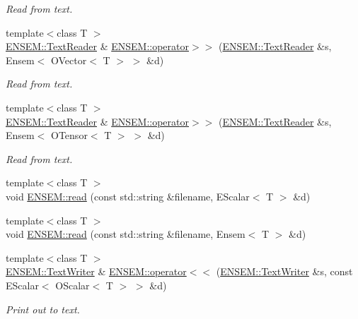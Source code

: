 \begin{DoxyCompactItemize}
\begin{DoxyCompactList}\small\item\em Read from text. \end{DoxyCompactList}\item 
{\footnotesize template$<$class T $>$ }\\\mbox{\hyperlink{classENSEM_1_1TextReader}{E\+N\+S\+E\+M\+::\+Text\+Reader}} \& \mbox{\hyperlink{namespaceENSEM_a0c98998b29525fa9334da078ac37fe70}{E\+N\+S\+E\+M\+::operator$>$$>$}} (\mbox{\hyperlink{classENSEM_1_1TextReader}{E\+N\+S\+E\+M\+::\+Text\+Reader}} \&s, Ensem$<$ O\+Vector$<$ T $>$ $>$ \&d)
\begin{DoxyCompactList}\small\item\em Read from text. \end{DoxyCompactList}\item 
{\footnotesize template$<$class T $>$ }\\\mbox{\hyperlink{classENSEM_1_1TextReader}{E\+N\+S\+E\+M\+::\+Text\+Reader}} \& \mbox{\hyperlink{namespaceENSEM_a0fb9e35cf8c1d41d42dd10cefcf7cbe5}{E\+N\+S\+E\+M\+::operator$>$$>$}} (\mbox{\hyperlink{classENSEM_1_1TextReader}{E\+N\+S\+E\+M\+::\+Text\+Reader}} \&s, Ensem$<$ O\+Tensor$<$ T $>$ $>$ \&d)
\begin{DoxyCompactList}\small\item\em Read from text. \end{DoxyCompactList}\item 
{\footnotesize template$<$class T $>$ }\\void \mbox{\hyperlink{namespaceENSEM_a22fcd7a4711d3682c9d89b9f605f11b4}{E\+N\+S\+E\+M\+::read}} (const std\+::string \&filename, E\+Scalar$<$ T $>$ \&d)
\item 
{\footnotesize template$<$class T $>$ }\\void \mbox{\hyperlink{namespaceENSEM_abba4aaa73ad3238ce36775177195cbdc}{E\+N\+S\+E\+M\+::read}} (const std\+::string \&filename, Ensem$<$ T $>$ \&d)
\item 
{\footnotesize template$<$class T $>$ }\\\mbox{\hyperlink{classENSEM_1_1TextWriter}{E\+N\+S\+E\+M\+::\+Text\+Writer}} \& \mbox{\hyperlink{namespaceENSEM_afd853d981d87472175af5dac828d6bbb}{E\+N\+S\+E\+M\+::operator$<$$<$}} (\mbox{\hyperlink{classENSEM_1_1TextWriter}{E\+N\+S\+E\+M\+::\+Text\+Writer}} \&s, const E\+Scalar$<$ O\+Scalar$<$ T $>$ $>$ \&d)
\begin{DoxyCompactList}\small\item\em Print out to text. \end{DoxyCompactList}\item 

\end{DoxyCompactItemize}
